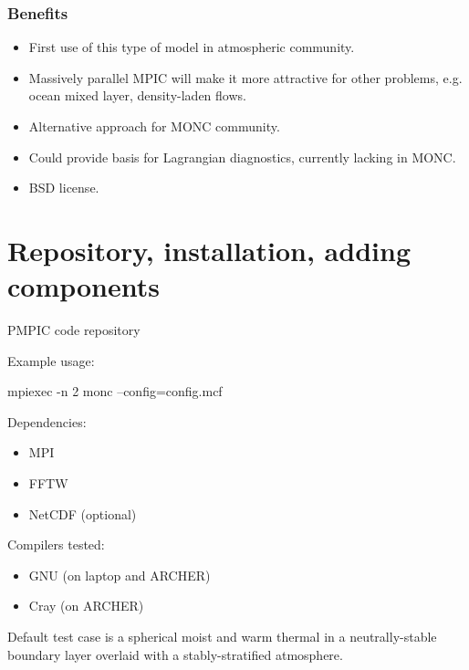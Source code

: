\documentclass{beamer}
\def\gr#1{\color{dark_green} #1}
\def\re#1{\color{red}   #1}
\def\bl#1{\color{blue}  #1}
\def\pu#1{\color{purple} #1}
\providecommand{\tightlist}{%
  \setlength{\itemsep}{0pt}\setlength{\parskip}{0pt}}
\begin{document}
\begin{frame}
\frametitle{Benefits}

\begin{itemize}
\item First use of this type of model in atmospheric community.
\item Massively parallel MPIC will make it more attractive for {\pu other problems}, e.g. ocean mixed layer, density-laden flows.
\item {\bl Alternative approach} for MONC community.
\item Could provide basis for Lagrangian diagnostics, currently {\re lacking in MONC}.
\item {\gr BSD} license.
\end{itemize}

\end{frame}

\hypertarget{welcome-to-the-pmpic-wiki}{%
\section{Repository, installation, adding components}\label{welcome-to-the-pmpic-wiki}}

\begin{frame}{PMPIC code repository}
\protect\hypertarget{pmpic-code-repository}{}

Example usage:

mpiexec -n 2 monc --config=config.mcf

Dependencies:

\begin{itemize}
\tightlist
\item
  MPI
\item
  FFTW
\item
  NetCDF (optional)
\end{itemize}

Compilers tested:

\begin{itemize}
\tightlist
\item
  GNU (on laptop and ARCHER)
\item
  Cray (on ARCHER)
\end{itemize}

\end{frame}

\begin{frame}
Default test case is a spherical moist and
warm thermal in a neutrally-stable boundary layer overlaid with a
stably-stratified atmosphere. 
\end{frame}
\end{document}
